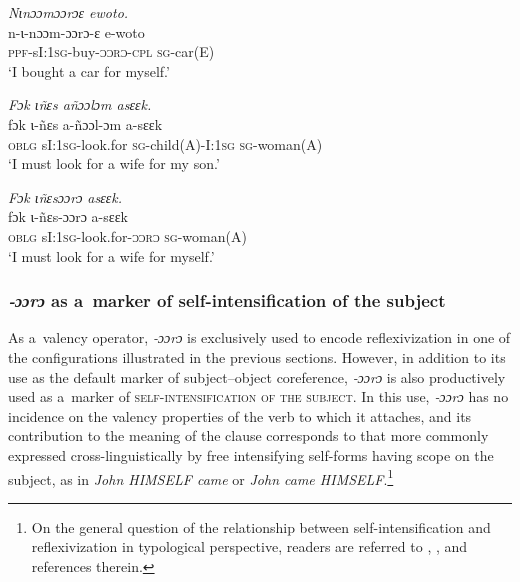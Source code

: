 \documentclass[output=paper]{langscibook}
\begin{document}
    \ex\label{ex:Creissels:28b}
    
      \textit{Nɩnɔɔmɔɔrɔɛ ewoto.}\\
      \gll n-ɩ-nɔɔm-ɔɔrɔ-ɛ e-woto\\
      \textsc{ppf}-sI:\textsc{1sg}-buy-\textsc{ɔɔrɔ-cpl} \textsc{sg}-car(E)\\
      \glt `I bought a car for myself.'

  \z
  \z

  \ea\label{ex:Creissels:29}
  
    \ea\label{ex:Creissels:29a}
    
      \textit{Fɔk ɩñɛs añɔɔlɔm asɛɛk.}\\
      \gll fɔk ɩ-ñɛs a-ñɔɔl-ɔm a-sɛɛk\\
      \textsc{oblg} sI:\textsc{1sg}-look.for \textsc{sg}-child(A)-I:\textsc{1sg} \textsc{sg}-woman(A)\\
      \glt `I must look for a wife for my son.'


    \ex\label{ex:Creissels:29b}
    
      \textit{Fɔk ɩñɛsɔɔrɔ asɛɛk.}\\
      \gll fɔk ɩ-ñɛs-ɔɔrɔ a-sɛɛk\\
      \textsc{oblg} sI:\textsc{1sg}-look.for-\textsc{ɔɔrɔ} \textsc{sg}-woman(A)\\
      \glt `I must look for a wife for myself.'

  \z
\z

\subsubsection{\textit{‑ɔɔrɔ} as a~marker of self-intensification of the subject}%
\label{sec:Creissels:ooro-intens}

As a~valency operator, \textit{‑ɔɔrɔ} is exclusively used to encode
reflexivization in one of the configurations illustrated in the previous
sections.  However, in addition to its use as the default marker of
subject--object coreference, \textit{‑ɔɔrɔ} is also productively used as a~marker
of \textsc{self-intensification of the subject}.  In this use, \textit{‑ɔɔrɔ} has
no incidence on the valency properties of the verb to which it attaches, and
its contribution to the meaning of the clause corresponds to that more commonly
expressed cross-linguistically by free intensifying self-forms having scope on
the subject, as in \textit{John HIMSELF came} or \textit{John came
  HIMSELF}.\footnote{ On the general question of the relationship between
  self-intensification and reflexivization in typological perspective, readers
  are referred to \citet{GastSiemund2006}, \citet{KoenigGast2006}, and
  references therein. }
\end{document}
